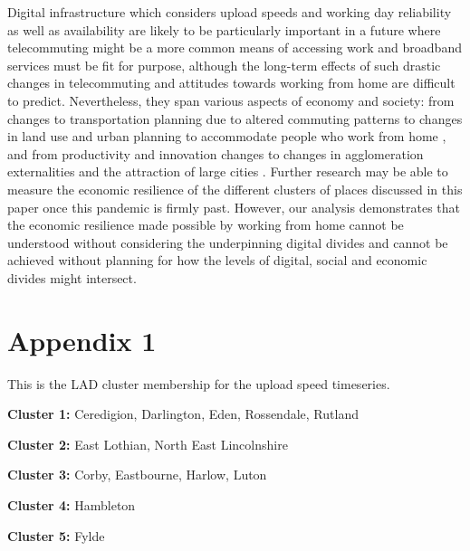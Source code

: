 \documentclass[Royal,times,sageh]{sagej}
\begin{document}
Digital infrastructure which considers upload speeds and working day
reliability as well as availability are likely to be particularly
important in a future where telecommuting might be a more common means
of accessing work and broadband services must be fit for purpose,
although the long-term effects of such drastic changes in telecommuting
and attitudes towards working from home are difficult to predict.
Nevertheless, they span various aspects of economy and society: from
changes to transportation planning due to altered commuting patterns to
changes in land use and urban planning to accommodate people who work
from home \citep{BUDNITZ2020102713, ELLDER2020102777}, and from
productivity and innovation changes to changes in agglomeration
externalities and the attraction of large cities \citep{econobs}.
Further research may be able to measure the economic resilience of the
different clusters of places discussed in this paper once this pandemic
is firmly past. However, our analysis demonstrates that the economic
resilience made possible by working from home cannot be understood
without considering the underpinning digital divides and cannot be
achieved without planning for how the levels of digital, social and
economic divides might intersect.

\hypertarget{appendix1}{%
\section{Appendix 1}\label{appendix1}}

This is the LAD cluster membership for the upload speed timeseries.

\textbf{Cluster 1: } Ceredigion, Darlington, Eden, Rossendale, Rutland

\textbf{Cluster 2: } East Lothian, North East Lincolnshire

\textbf{Cluster 3: } Corby, Eastbourne, Harlow, Luton

\textbf{Cluster 4: } Hambleton

\textbf{Cluster 5: } Fylde
\end{document}
